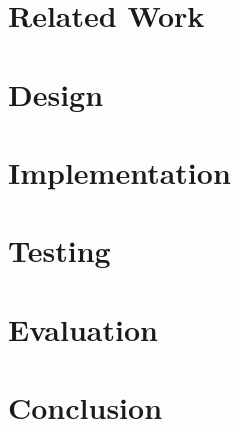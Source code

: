 \documentclass{article}
\begin{document}
\newpage
\section{Related Work}
\lipsum[2-4]

\newpage
\section{Design}
\lipsum[2-4]

\newpage
\section{Implementation}
\lipsum[2-4]

\newpage
\section{Testing}
\lipsum[2-4]

\newpage
\section{Evaluation}
\lipsum[2-4]

\newpage
\section{Conclusion}
\lipsum[2-4]
\end{document}
